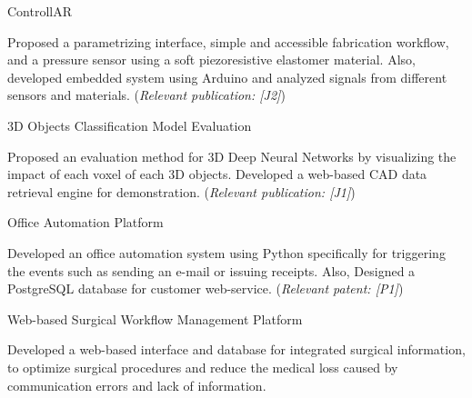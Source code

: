 \begin{cventries}

\cvpub
{ControllAR} %
{ %
\begin{cvitems}
\item {Proposed a parametrizing interface, simple and accessible fabrication workflow, and a pressure sensor using a soft piezoresistive elastomer material. Also, developed embedded system using Arduino and analyzed signals from different sensors and materials. (\textit{Relevant publication: [J2]})}
\end{cvitems}
}

\cvpub
{3D Objects Classification Model Evaluation} %
{ %
\begin{cvitems}
\item {Proposed an evaluation method for 3D Deep Neural Networks by visualizing the impact of each voxel of each 3D objects. Developed a web-based CAD data retrieval engine for demonstration. (\textit{Relevant publication: [J1]})}
\end{cvitems}
}

\cvpub
{Office Automation Platform} %
{ %
\begin{cvitems}
\item {Developed an office automation system using Python specifically for triggering the events such as sending an e-mail or issuing receipts. Also, Designed a PostgreSQL database for customer web-service. (\textit{Relevant patent: [P1]})}
\end{cvitems}
}

\cvpub
{Web-based Surgical Workflow Management Platform} %
{ %
\begin{cvitems}
\item {Developed a web-based interface and database for integrated surgical information, to optimize surgical procedures and reduce the medical loss caused by communication errors and lack of information.}
\end{cvitems}
}

\end{cventries}